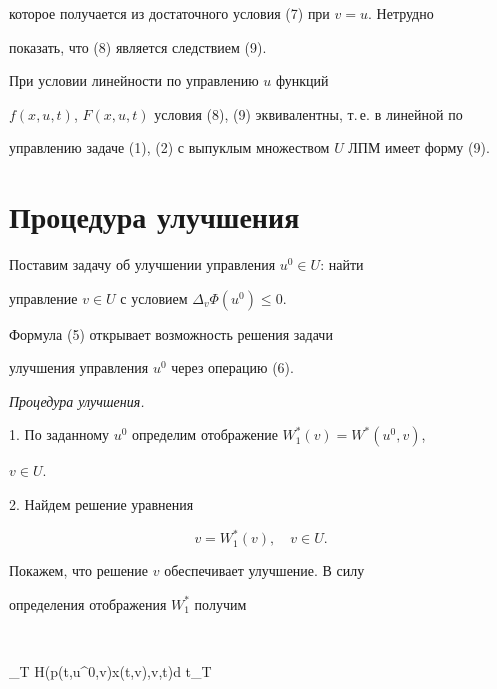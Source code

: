 которое получается из достаточного условия (7) при $v=u$. Нетрудно 


показать, что (8) является следствием (9). 


 


При условии линейности по управлению $u$ функций 


$f(x,u,t)$, $F(x,u,t)$ условия (8), (9) эквивалентны, т.\,е. в линейной по 


управлению задаче (1), (2) с выпуклым множеством $U$ ЛПМ имеет форму (9). 


 


\section{Процедура улучшения} 


 


Поставим задачу об улучшении управления $u^0\in U$: найти 


управление $v\in U$ с условием $\Delta_v\Phi(u^0)\le0$. 


Формула (5) открывает возможность решения задачи 


улучшения управления $u^0$ через операцию (6). 


\medskip 


 


{\it Процедура улучшения.} 


 


1. По заданному $u^0$ определим отображение $W^*_1(v)=W^*(u^0,v)$, 


$v\in U$. 


 


2. Найдем решение уравнения 


\begin{equation} 


v=W^*_1(v),\quad v\in U. 


\end{equation} 


 


Покажем, что решение $v$ обеспечивает улучшение. В силу 


определения отображения $W^*_1$ получим 


$$ 


\int_T H(p(t,u^0,v)x(t,v),v,t)d t\ge\int_T 


